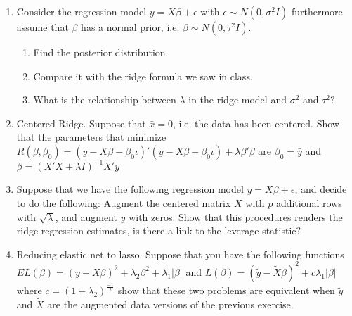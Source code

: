 \documentclass[12pt,onecolumn]{article}
\begin{document}
\begin{enumerate}
\begin{enumerate}
    \end{enumerate}  
    \item Consider the regression model $y=X\beta +\epsilon$ with $\epsilon\sim N(0,\sigma^2I)$ furthermore assume that $\beta$ has a normal prior, i.e. $\beta\sim N(0,\tau^2I)$. 
  \begin{enumerate}
      \item Find the posterior distribution. 
      \item Compare it with the ridge formula we saw in class. 
      \item What is the relationship between $\lambda$ in the ridge model and $\sigma^2$ and $\tau^2$?
  \end{enumerate}
    \item Centered Ridge. Suppose that $\bar x= 0$, i.e. the data has been centered. Show that the parameters that minimize $R(\beta,\beta_0) = (y-X\beta-\beta_0 \iota)'(y-X\beta-\beta_0 \iota)+ \lambda\beta'\beta$ are $\beta_0=\bar y$ and $\beta=(X'X+\lambda I)^{-1}X'y$
  
    \item Suppose that we have the following regression model  $y=X\beta +\epsilon$, and decide to do the following: Augment the centered matrix $X$ with $p$ additional rows with $\sqrt{\lambda}$, and augment $y$ with zeros. Show that this procedures renders the ridge regression estimates, is there a link to the leverage statistic?
  
    \item Reducing elastic net to lasso. Suppose that you have the following functions $EL(\beta) = (y-X\beta)^2+ \lambda_2 \beta^2+ \lambda_1|\beta|$ and $L(\beta) = (\tilde{y}-\tilde{X}\beta)^2+ c \lambda_1|\beta|$ where $c=(1+\lambda_2)^{\frac{-1}{2}}$ show that these two problems are equivalent when $\tilde{y}$ and $\tilde{X}$ are the augmented data versions of the previous exercise.
  \end{enumerate}
\end{document}
